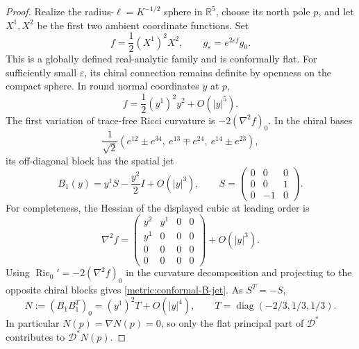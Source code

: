 \documentclass[11pt]{article}
\numberwithin{equation}{section}
\theoremstyle{definition}
\theoremstyle{remark}
\begin{document}
\begin{proof}
Realize the radius-$\ell=K^{-1/2}$ sphere in $\mathbb R^5$, choose its north pole
$p$, and let $X^1,X^2$ be the first two ambient coordinate functions.
Set
\[
 f=\frac12(X^1)^2X^2,\qquad g_\varepsilon=e^{2\varepsilon f}g_0.
\]
This is a globally defined real-analytic family and is conformally flat.
For sufficiently small $\varepsilon$, its chiral connection remains
definite by openness on the compact sphere. In round normal coordinates
$y$ at $p$,
\[
 f=\frac12(y^1)^2y^2+O(|y|^5).
\]
The first variation of trace-free Ricci curvature is
$-2(\nabla^2f)_0$. In the chiral bases
\[
 \frac1{\sqrt2}(e^{12}\pm e^{34},\ e^{13}\mp e^{24},\ e^{14}\pm e^{23}),
\]
its off-diagonal block has the spatial jet
\begin{equation}\label{metric:conformal-B-jet}
 B_1(y)=y^1S-\frac{y^2}{2}I+O(|y|^3),\qquad
 S=\begin{pmatrix}0&0&0\\0&0&1\\0&-1&0\end{pmatrix}.
\end{equation}
For completeness, the Hessian of the displayed cubic at leading order is
\[
 \nabla^2f=
 \begin{pmatrix}y^2&y^1&0&0\\y^1&0&0&0\\0&0&0&0\\0&0&0&0\end{pmatrix}
 +O(|y|^3).
\]
Using $\operatorname{Ric}_0'=-2(\nabla^2 f)_0$ in the curvature decomposition and projecting to the
opposite chiral blocks gives \eqref{metric:conformal-B-jet}.
As $S^T=-S$,
\begin{equation}\label{metric:conformal-N-jet}
 N:=(B_1B_1^T)_0
 =(y^1)^2T+O(|y|^4),\qquad
 T=\operatorname{diag}(-2/3,1/3,1/3).
\end{equation}
In particular $N(p)=\nabla N(p)=0$, so only the flat principal part of
$\mathcal D^*$ contributes to $\mathcal D^*N(p)$.


\end{proof}
\end{document}
